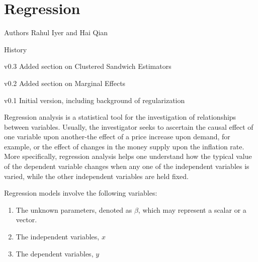 
\chapter[Regression]{Regression}
\begin{moduleinfo}
\item[Authors] {Rahul Iyer and Hai Qian}
\item[History]
	\begin{modulehistory}
    \item[v0.3] Added section on Clustered Sandwich Estimators
    \item[v0.2] Added section on Marginal Effects
		\item[v0.1] Initial version, including background of regularization
	\end{modulehistory}
\end{moduleinfo}


Regression analysis is a statistical tool for the investigation of
relationships between variables. Usually, the investigator seeks to ascertain
the causal effect of one variable upon another-the effect of a price increase
upon demand, for example, or the effect of changes in the money supply upon the
inflation rate. More specifically, regression analysis helps one understand how
the typical value of the dependent variable changes when any one of the
independent variables is varied, while the other independent variables are held
fixed.

Regression models involve the following variables:
\begin{enumerate}
    \item The unknown parameters, denoted as $\beta$, which may represent a scalar or a vector.
    \item The independent variables, $x$
    \item The dependent variables, $y$
\end{enumerate}



